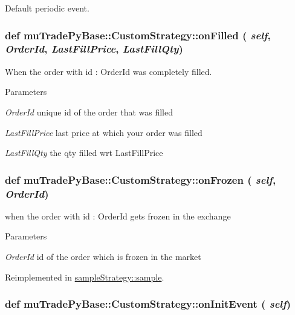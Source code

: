 Default periodic event. \hypertarget{classmuTradePyBase_1_1CustomStrategy_afade8f1587aab216a8aa6a7f0be1300f}{
\subsubsection[{onFilled}]{\setlength{\rightskip}{0pt plus 5cm}def muTradePyBase::CustomStrategy::onFilled ( {\em self}, \/   {\em OrderId}, \/   {\em LastFillPrice}, \/   {\em LastFillQty})}}
\label{classmuTradePyBase_1_1CustomStrategy_afade8f1587aab216a8aa6a7f0be1300f}


When the order with id : OrderId was completely filled. 
\begin{DoxyParams}{Parameters}
\item[{\em OrderId}]unique id of the order that was filled \item[{\em LastFillPrice}]last price at which your order was filled \item[{\em LastFillQty}]the qty filled wrt LastFillPrice \end{DoxyParams}
\hypertarget{classmuTradePyBase_1_1CustomStrategy_a40cb69958575c0a0a7e435d3ac0fe9f9}{
\subsubsection[{onFrozen}]{\setlength{\rightskip}{0pt plus 5cm}def muTradePyBase::CustomStrategy::onFrozen ( {\em self}, \/   {\em OrderId})}}
\label{classmuTradePyBase_1_1CustomStrategy_a40cb69958575c0a0a7e435d3ac0fe9f9}


when the order with id : OrderId gets frozen in the exchange 
\begin{DoxyParams}{Parameters}
\item[{\em OrderId}]id of the order which is frozen in the market \end{DoxyParams}


Reimplemented in \hyperlink{classsampleStrategy_1_1sample_af7a376b4e20ecd8bc87e339f53b8f932}{sampleStrategy::sample}.\hypertarget{classmuTradePyBase_1_1CustomStrategy_a8accc7202088d5163a9bffa940961713}{
\subsubsection[{onInitEvent}]{\setlength{\rightskip}{0pt plus 5cm}def muTradePyBase::CustomStrategy::onInitEvent ( {\em self})}}
\label{classmuTradePyBase_1_1CustomStrategy_a8accc7202088d5163a9bffa940961713}


